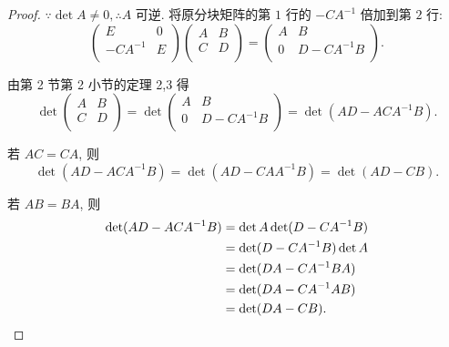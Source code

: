 \documentclass[color=black,device=normal,lang=cn,mode=geye]{elegantnote}
\begin{document}
\begin{proof}
    $\because\det A\neq0,\therefore A$ 可逆. 将原分块矩阵的第 $1$ 行的 $-CA^{-1}$ 倍加到第 $2$ 行:
    \[\begin{pmatrix}
        E & 0 \\
        -CA^{-1} & E \\
    \end{pmatrix}\begin{pmatrix}
        A & B \\
        C & D \\
    \end{pmatrix}=\begin{pmatrix}
        A & B \\
        0 & D-CA^{-1}B \\
    \end{pmatrix}.\]

    由第 2 节第 2 小节的定理 2,3 得
    \[\det\begin{pmatrix}
        A & B \\
        C & D \\
    \end{pmatrix}=\det\begin{pmatrix}
        A & B \\
        0 & D-CA^{-1}B \\
    \end{pmatrix}=\det(AD-ACA^{-1}B).\]

    若 $AC=CA$, 则
    \[\det(AD-ACA^{-1}B)=\det(AD-CAA^{-1}B)=\det(AD-CB).\]

    若 $AB=BA$, 则
    \begin{align*}
        \det(AD-ACA^{-1}B) & =\det A\det(D-CA^{-1}B) \\
        & =\det(D-CA^{-1}B)\det A \\
        & =\det(DA-CA^{-1}BA) \\
        & =\det(DA-CA^{-1}AB) \\
        & =\det(DA-CB).\qedhere
    \end{align*}
\end{proof}
\end{document}
